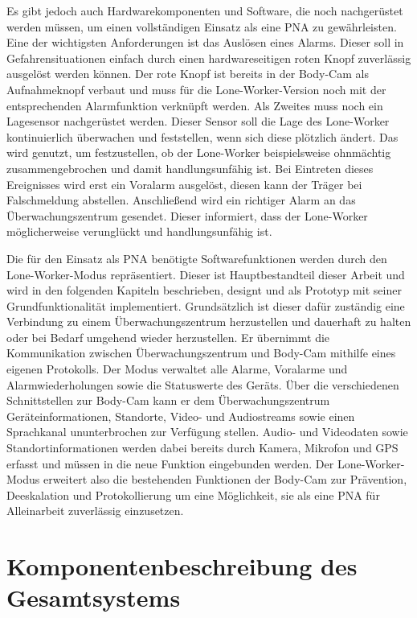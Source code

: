 \documentclass[thesis.tex]{subfiles}
\begin{document}
Es gibt jedoch auch Hardwarekomponenten und Software, die noch nachgerüstet werden müssen, um einen vollständigen Einsatz als eine PNA zu gewährleisten.
Eine der wichtigsten Anforderungen ist das Auslösen eines Alarms.
Dieser soll in Gefahrensituationen einfach durch einen hardwareseitigen roten Knopf zuverlässig ausgelöst werden können.
Der rote Knopf ist bereits in der Body-Cam als Aufnahmeknopf verbaut und muss für die Lone-Worker-Version noch mit der entsprechenden Alarmfunktion verknüpft werden.
Als Zweites muss noch ein Lagesensor nachgerüstet werden.
Dieser Sensor soll die Lage des Lone-Worker kontinuierlich überwachen und feststellen, wenn sich diese plötzlich ändert.
Das wird genutzt, um festzustellen, ob der Lone-Worker beispielsweise ohnmächtig zusammengebrochen und damit handlungsunfähig ist.
Bei Eintreten dieses Ereignisses wird erst ein Voralarm ausgelöst, diesen kann der Träger bei Falschmeldung abstellen.
Anschließend wird ein richtiger Alarm an das Überwachungszentrum gesendet.
Dieser informiert, dass der Lone-Worker möglicherweise verunglückt und handlungsunfähig ist.

Die für den Einsatz als PNA benötigte Softwarefunktionen werden durch den Lone-Worker-Modus repräsentiert.
Dieser ist Hauptbestandteil dieser Arbeit und wird in den folgenden Kapiteln beschrieben, designt und als Prototyp mit seiner Grundfunktionalität implementiert.
Grundsätzlich ist dieser dafür zuständig eine Verbindung zu einem Überwachungszentrum herzustellen und dauerhaft zu halten oder bei Bedarf umgehend wieder herzustellen.
Er übernimmt die Kommunikation zwischen Überwachungszentrum und Body-Cam mithilfe eines eigenen Protokolls.
Der Modus verwaltet alle Alarme, Voralarme und Alarmwiederholungen sowie die Statuswerte des Geräts.
Über die verschiedenen Schnittstellen zur Body-Cam kann er dem Überwachungszentrum Geräteinformationen, Standorte, Video- und Audiostreams sowie einen Sprachkanal ununterbrochen zur Verfügung stellen.
Audio- und Videodaten sowie Standortinformationen werden dabei bereits durch Kamera, Mikrofon und GPS erfasst und müssen in die neue Funktion eingebunden werden.
Der Lone-Worker-Modus erweitert also die bestehenden Funktionen der Body-Cam zur Prävention, Deeskalation und Protokollierung um eine Möglichkeit, sie als eine PNA für Alleinarbeit zuverlässig einzusetzen.

\section{Komponentenbeschreibung des Gesamtsystems}\label{chap:gesamtsystem}
\end{document}
